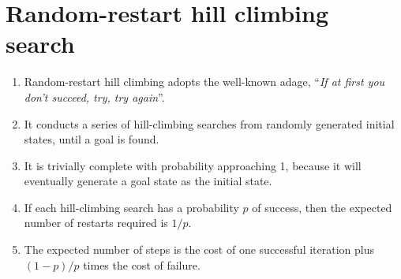\section{Random-restart hill climbing search \cite{ai/book/Artificial-Intelligence-A-Modern-Approach/Russell-Norvig}}
\label{AI: Algorithms/Random-restart hill climbing search}


\begin{enumerate}
    \item Random-restart hill climbing adopts the well-known adage, “\textit{If at first you don’t succeed, try, try again}”.
    \hfill \cite{ai/book/Artificial-Intelligence-A-Modern-Approach/Russell-Norvig}

    \item It conducts a series of hill-climbing searches from randomly generated initial states, until a goal is found.
    \hfill \cite{ai/book/Artificial-Intelligence-A-Modern-Approach/Russell-Norvig}

    \item It is trivially complete with probability approaching 1, because it will eventually generate a goal state as the initial state.
    \hfill \cite{ai/book/Artificial-Intelligence-A-Modern-Approach/Russell-Norvig}

    \item If each hill-climbing search has a probability $p$ of success, then the expected number of restarts required is $1/p$.
    \hfill \cite{ai/book/Artificial-Intelligence-A-Modern-Approach/Russell-Norvig}

    \item The expected number of steps is the cost of one successful iteration plus $(1-p)/p$ times the cost of failure.
    \hfill \cite{ai/book/Artificial-Intelligence-A-Modern-Approach/Russell-Norvig}
\end{enumerate}







